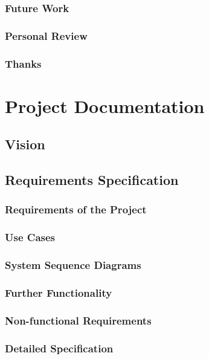 \documentclass[a4paper,parskip=full]{scrreprt}
\begin{document}
\section{Future Work}
\section{Personal Review}
\section{Thanks}


\part{Project Documentation}
\chapter{Vision}

\chapter{Requirements Specification}
\section{Requirements of the Project}
\section{Use Cases}
\section{System Sequence Diagrams}
\section{Further Functionality}
\section{Non-functional Requirements}
\section{Detailed Specification}
\end{document}
